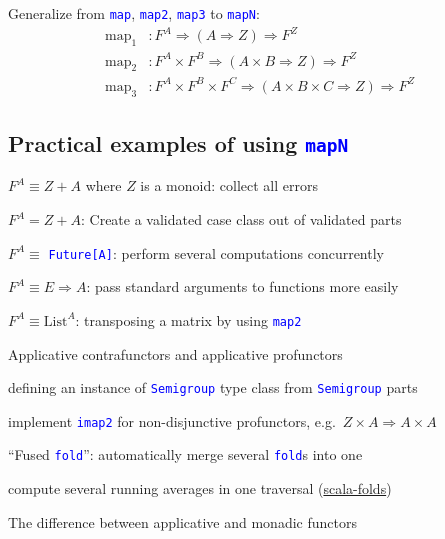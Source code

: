 Generalize from \texttt{\textcolor{blue}{\footnotesize{}map}}, \texttt{\textcolor{blue}{\footnotesize{}map2}},
\texttt{\textcolor{blue}{\footnotesize{}map3}} to \texttt{\textcolor{blue}{\footnotesize{}mapN}}:
\begin{align*}
\text{map}_{1} & :F^{A}\Rightarrow\left(A\Rightarrow Z\right)\Rightarrow F^{Z}\\
\text{map}_{2} & :F^{A}\times F^{B}\Rightarrow\left(A\times B\Rightarrow Z\right)\Rightarrow F^{Z}\\
\text{map}_{3} & :F^{A}\times F^{B}\times F^{C}\Rightarrow\left(A\times B\times C\Rightarrow Z\right)\Rightarrow F^{Z}
\end{align*}


\subsection{Practical examples of using \texttt{\textcolor{blue}{\footnotesize{}mapN}} }

\vspace{-0.2cm}$F^{A}\equiv Z+A$ where $Z$ is a monoid: collect
all errors

$F^{A}=Z+A$: Create a validated case class out of validated parts

$F^{A}\equiv$ \texttt{\textcolor{blue}{\footnotesize{}Future{[}A{]}}}:
perform several computations concurrently

$F^{A}\equiv E\Rightarrow A$: pass standard arguments to functions
more easily

$F^{A}\equiv\text{List}^{A}$: transposing a matrix by using \texttt{\textcolor{blue}{\footnotesize{}map2}} 

Applicative contrafunctors and applicative profunctors

defining an instance of \texttt{\textcolor{blue}{\footnotesize{}Semigroup}}
type class from \texttt{\textcolor{blue}{\footnotesize{}Semigroup}}
parts

implement \texttt{\textcolor{blue}{\footnotesize{}imap2}} for non-disjunctive
profunctors, e.g.\ $Z\times A\Rightarrow A\times A$

``Fused \texttt{\textcolor{blue}{\footnotesize{}fold}}'': automatically
merge several \texttt{\textcolor{blue}{\footnotesize{}fold}}s into
one

compute several running averages in one traversal (\href{https://github.com/amarpotghan/scala-fold}{scala-folds})

The difference between applicative and monadic functors

